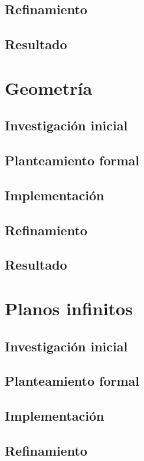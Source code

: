 \subsection{Refinamiento}
\subsection{Resultado}

\section{Geometría}

\subsection{Investigación inicial}
\subsection{Planteamiento formal}
\subsection{Implementación}
\subsection{Refinamiento}
\subsection{Resultado}

\section{Planos infinitos}

\subsection{Investigación inicial}
\subsection{Planteamiento formal}
\subsection{Implementación}
\subsection{Refinamiento}
